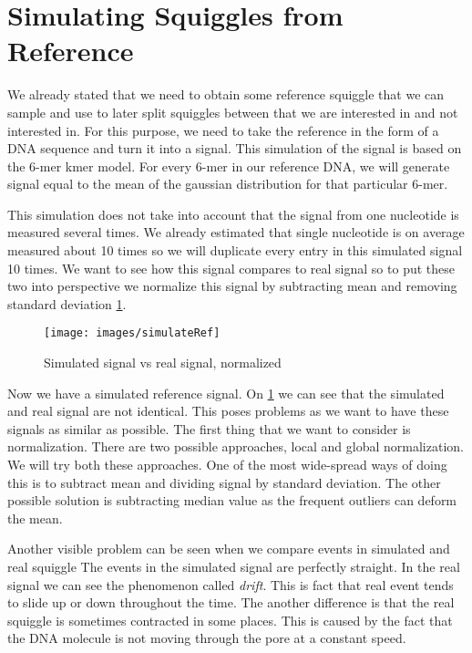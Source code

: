 \section{Simulating Squiggles from Reference}

We already stated that we need to obtain some reference squiggle that we
can sample and use to later split squiggles between that we are interested in and not
interested in. For this purpose, we need to take the reference in the form of a DNA sequence
and turn it into a signal. This simulation of the signal is based on the 6-mer kmer model.
For every 6-mer in our reference DNA, we will generate signal equal to the mean
of the gaussian distribution for that particular 6-mer.

This simulation does not take into account that the signal from one nucleotide is
measured several times. We already estimated that single nucleotide is on average
measured about 10 times so we will duplicate every entry in this simulated signal
10 times. We want to see how this signal compares to real signal so to put these
two into perspective we normalize this signal by subtracting mean and removing
standard deviation \ref{obr:simVsReal}.

\begin{figure}
\centerline{\texttt{[image: images/simulateRef]}}
\caption[Hehe]{Simulated signal vs real signal, normalized}
\label{obr:simVsReal}
\end{figure}

Now we have a simulated reference signal. On \ref{obr:simVsReal} we can see that the simulated and real
signal are not identical. This poses problems as we want to have these signals as
similar as possible. The first thing that we want to consider is normalization. There
are two possible approaches, local and global normalization. We will try both these
approaches. One of the most wide-spread ways of doing this is to subtract mean and dividing
signal by standard deviation. The other possible solution is subtracting median value
as the frequent outliers can deform the mean.

Another visible problem can be seen when we compare events in simulated and real squiggle
The events in the simulated signal are perfectly straight. In the real signal we can see
the phenomenon called \textit{drift}. This is fact that real event tends to slide
up or down throughout the time. The another difference is that the real squiggle
is sometimes contracted in some places. This is caused by the fact that the DNA
molecule is not moving through the pore at a constant speed.

